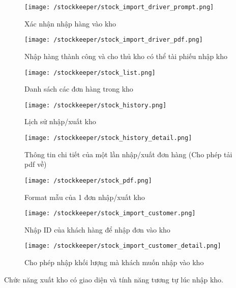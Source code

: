 				\begin{figure}[H]
					\texttt{[image: /stockkeeper/stock\_import\_driver\_prompt.png]}
					\centering
					\caption{Xác nhận nhập hàng vào kho}
				\end{figure}
			
				\begin{figure}[H]
					\texttt{[image: /stockkeeper/stock\_import\_driver\_pdf.png]}
					\centering
					\caption{Nhập hàng thành công và cho thủ kho có thể tài phiếu nhập kho}
				\end{figure}
			
				\begin{figure}[H]
					\texttt{[image: /stockkeeper/stock\_list.png]}
					\centering
					\caption{Danh sách các đơn hàng trong kho}
				\end{figure}
			
				\begin{figure}[H]
					\texttt{[image: /stockkeeper/stock\_history.png]}
					\centering
					\caption{Lịch sử nhập/xuất kho}
				\end{figure}
			
				\begin{figure}[H]
					\texttt{[image: /stockkeeper/stock\_history\_detail.png]}
					\centering
					\caption{Thông tin chi tiết của một lần nhập/xuất đơn hàng (Cho phép tải pdf về)}
				\end{figure}
			
				\begin{figure}[H]
					\texttt{[image: /stockkeeper/stock\_pdf.png]}
					\centering
					\caption{Format mẫu của 1 đơn nhập/xuất kho}
				\end{figure}
			
				\begin{figure}[H]
					\texttt{[image: /stockkeeper/stock\_import\_customer.png]}
					\centering
					\caption{Nhập ID của khách hàng để nhập đơn vào kho}
				\end{figure}
			
				\begin{figure}[H]
					\texttt{[image: /stockkeeper/stock\_import\_customer\_detail.png]}
					\centering
					\caption{Cho phép nhập khối lượng mà khách muốn nhập vào kho}
				\end{figure}
			
				Chức năng xuất kho có giao diện và tính năng tương tự lúc nhập kho.
				